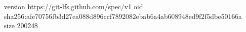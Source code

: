 version https://git-lfs.github.com/spec/v1
oid sha256:afe70756fb3d27ea088d896ccf7892082ebab6a4ab608948ed9f2f5dbe50166a
size 200248
